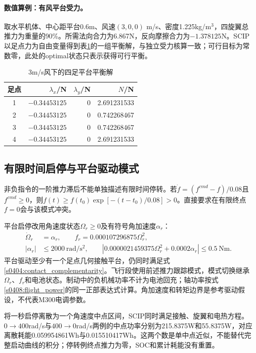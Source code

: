 \paragraph{数值算例：有风平台受力。}
取水平机体、中心距平台0.6m、风速$(3,0,0)$ m/s、密度1.225kg/m$^3$，四旋翼总推力为重量的90\%。所需法向合力为6.867N，反向摩擦合力为$-1.378125$N。SCIP以足点力为自由变量得到表\ref{s0404:foot_result}的一组平衡解，与独立受力核算一致；可行目标为常数零，此处的optimal状态只表示获得可行平衡。
\begin{table}[!ht]\centering\small
\caption{3m/s风下的四足平台平衡解}\label{s0404:foot_result}
\begin{tabular}{@{}crrr@{}}\toprule
足点 & $\lambda_x$/N & $\lambda_y$/N & $N$/N\\\midrule
1 & $-0.34453125$ & 0 & 2.691231533\\
2 & $-0.34453125$ & 0 & 0.742268467\\
3 & $-0.34453125$ & 0 & 0.742268467\\
4 & $-0.34453125$ & 0 & 2.691231533\\\bottomrule
\end{tabular}\end{table}

\subsection{有限时间启停与平台驱动模式}
非负指令的一阶推力滞后不能单独描述有限时间停转。若$\dot f=(f^{cmd}-f)/0.08$且$f^{cmd}\ge0$，则$f(t)\ge f(t_0)\exp[-(t-t_0)/0.08]>0$。直接要求在有限终点$f=0$会与该模式冲突。

平台启停改用角速度状态$\Omega_r\ge0$及有符号角加速度$\alpha_r$：
\begin{subequations}
\label{s0404:ground_drive}
\begin{align}
 \dot\Omega_r&=\alpha_r,\qquad f_r=0.000107296875\Omega_r^2,\\
 |\alpha_r|&\le2000\ \mathrm{rad/s^2},\qquad
 |0.0000021459375\Omega_r^2+0.0002\alpha_r|\le0.5\ \mathrm{Nm}.
\end{align}
\end{subequations}
平台驱动至少有一个足点几何接触平台，仍同时满足式\eqref{s0404:contact_complementarity}。飞行段使用前述推力跟踪模式，模式切换继承$\Omega_r$、$f_r$和电池状态。制动中的负机械功率不计为电池回充；轴功率按式\eqref{s0408:flight_power}的同一正部表达式计算。角加速度和转矩边界是参考驱动假设，不代表M300电调参数。

将一秒启停离散为一个角速度中点区间，SCIP同时满足接触、旋翼和电热方程。$0\to400$rad/s与$400\to0$rad/s两例的中点功率分别为215.8375W和55.8375W，对应离散耗能0.059954861Wh与0.015510417Wh。这两个数是单中点近似，不能替代完整启动曲线的积分；停转例终点推力为零，SOC和累计耗能没有重置。

